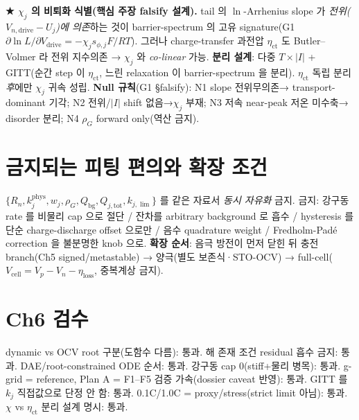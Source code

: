 \documentclass[11pt,a4paper]{article}
\newcommand{\drive}{\mathrm{drive}}\newcommand{\tot}{\mathrm{tot}}\newcommand{\bg}{\mathrm{bg}}
\newcommand{\cell}{\mathrm{cell}}\newcommand{\OCV}{\mathrm{OCV}}\newcommand{\ct}{\mathrm{ct}}
\begin{document}
\textbf{★ $\chi_j$ 의 비퇴화 식별(핵심 주장 falsify 설계).} tail 의 $\ln$-Arrhenius slope 가
\emph{전위($V_{n,\drive}-U_j$)에 의존}하는 것이 barrier-spectrum 의 고유 signature(G1
$\partial\ln L/\partial V_\drive=-\chi_j s_{\phi,j}F/RT$). 그러나 charge-transfer 과전압 $\eta_\ct$ 도
Butler--Volmer 라 전위 지수의존 → $\chi_j$ 와 \emph{co-linear} 가능. \textbf{분리 설계}: 다중
$T\times|I|$ + GITT(순간 step 이 $\eta_\ct$, 느린 relaxation 이 barrier-spectrum 을 분리). $\eta_\ct$
독립 분리 \emph{후}에만 $\chi_j$ 귀속 성립. \textbf{Null 규칙}(G1 \S falsify): N1 slope 전위무의존→
transport-dominant 기각; N2 전위/$|I|$ shift 없음→$\chi_j$ 부재; N3 저속 near-peak 저온 미수축→
disorder 분리; N4 $\rho_G$ forward only(역산 금지).

\section{금지되는 피팅 편의와 확장 조건}\label{sec:ch6_forbid}
$\{R_n,k_j^\mathrm{phys},w_j,\rho_G,Q_\bg,Q_{j,\tot},k_{j,\lim}\}$ 를 같은 자료서 \emph{동시 자유화} 금지.
금지: 강구동 rate 를 비물리 cap 으로 절단 / 잔차를 arbitrary background 로 흡수 / hysteresis 를 단순
charge-discharge offset 으로만 / 음수 quadrature weight / Fredholm-Padé correction 을 불분명한 knob 으로.
\textbf{확장 순서}: 음극 방전이 먼저 닫힌 뒤 충전 branch(Ch5 signed/metastable) → 양극(별도 보존식·STO-OCV)
→ full-cell($V_\cell=V_p-V_n-\eta_\mathrm{loss}$, 중복계상 금지).

\section{Ch6 검수}\label{sec:ch6_check}
{\small dynamic vs OCV root 구분(도함수 다름): 통과. 해 존재 조건 residual 흡수 금지: 통과.
DAE/root-constrained ODE 순서: 통과. 강구동 cap 0(stiff+물리 병목): 통과. g-grid = reference,
Plan A = F1--F5 검증 가속(dossier caveat 반영): 통과. GITT 를 $k_j$ 직접값으로 단정 안 함: 통과.
0.1C/1.0C = proxy/stress(strict limit 아님): 통과. $\chi$ vs $\eta_\ct$ 분리 설계 명시: 통과.}

\end{document}
